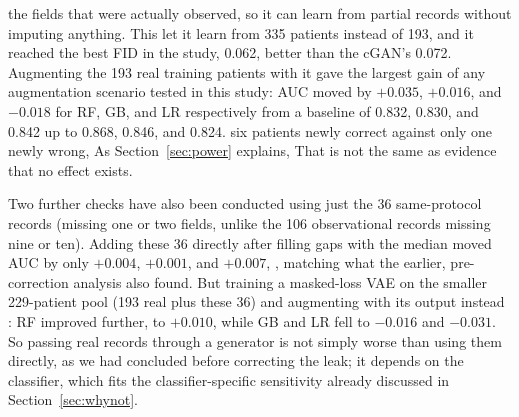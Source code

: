  the fields that were actually observed, so it can learn from partial records without imputing anything. This let it learn from 335 patients instead of 193, and it reached the best FID in the study, 0.062, better than the cGAN's 0.072. Augmenting the 193 real training patients with it gave the largest gain of any augmentation scenario tested in this study: AUC moved by $+0.035$, $+0.016$, and $-0.018$ for RF, GB, and LR respectively from a baseline of 0.832, 0.830, and 0.842 up to 0.868, 0.846, and 0.824.  six patients newly correct against only one newly wrong,  As Section~\ref{sec:power} explains,  That is not the same as evidence that no effect exists.

Two further checks have also been conducted using just the 36 same-protocol records (missing one or two fields, unlike the 106 observational records missing nine or ten). Adding these 36 directly after filling gaps with the median moved AUC by only $+0.004$, $+0.001$, and $+0.007$, , matching what the earlier, pre-correction analysis also found. But training a masked-loss VAE on the smaller 229-patient pool (193 real plus these 36) and augmenting with its output instead : RF improved further, to $+0.010$, while GB and LR fell to $-0.016$ and $-0.031$. So passing real records through a generator is not simply worse than using them directly, as we had concluded before correcting the leak; it depends on the classifier, which fits the classifier-specific sensitivity already discussed in Section~\ref{sec:whynot}.


